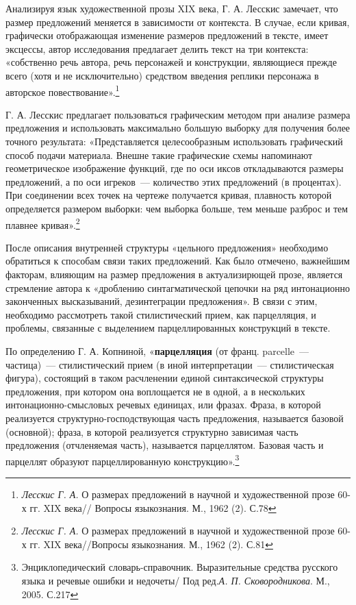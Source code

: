 \documentclass{kursa4}
\begin{document}
      Анализируя язык художественной прозы XIX века, Г. А. Лесскис замечает, что размер предложений меняется в зависимости от контекста. В случае, если кривая, графически отображающая изменение размеров предложений в тексте, имеет эксцессы, автор исследования предлагает делить текст на три контекста: «собственно речь автора, речь персонажей и конструкции, являющиеся прежде всего (хотя и не исключительно) средством введения реплики персонажа в авторское повествование».\footnote{\textit{{ Лесскис Г. А. }}{О размерах предложений в научной и художественной прозе 60-х гг. XIX века// Вопросы языкознания. М., 1962 (2). С.78}}

      Г. А. Лесскис предлагает пользоваться графическим методом при анализе размера предложения и использовать максимально большую выборку для получения более точного результата: «Представляется целесообразным использовать графический способ подачи материала. Внешне такие графические схемы напоминают геометрическое изображение функций, где по оси иксов откладываются размеры предложений, а по оси игреков~--- количество этих предложений (в процентах). При соединении всех точек на чертеже получается кривая, плавность которой определяется размером выборки: чем выборка больше, тем меньше разброс и тем плавнее кривая».\footnote{\textit{{ Лесскис Г. А. }}{О размерах предложений в научной и художественной прозе 60-х гг. XIX века//Вопросы языкознания. М., 1962 (2). С.81}}

      После описания внутренней структуры «цельного предложения» необходимо обратиться к способам связи таких предложений. Как было отмечено, важнейшим факторам, влияющим на размер предложения в актуализирющей прозе, является стремление автора к «дроблению синтагматической цепочки на ряд интонационно законченных высказываний, дезинтеграции предложения». В связи с этим, необходимо рассмотреть такой стилистический прием, как парцелляция, и проблемы, связанные с выделением парцеллированных конструкций в тексте. 

      По определению Г. А. Копниной, «\textbf{парцелляция} (от франц. parcelle~--- частица)~--- стилистический прием (в иной интерпретации~--- стилистическая фигура), состоящий в таком расчленении единой синтаксической структуры предложения, при котором она воплощается не в одной, а в нескольких интонационно-смысловых речевых единицах, или фразах. Фраза, в которой реализуется структурно-господствующая часть предложения, называется базовой (основной); фраза, в которой реализуется структурно зависимая часть предложения (отчленяемая часть), называется парцеллятом. Базовая часть и парцеллят образуют парцеллированную конструкцию».\footnote{Энциклопедический словарь-справочник. Выразительные средства русского языка и речевые ошибки и недочеты/ Под ред.\textit{А. П. Сковородникова}{. М., 2005. С.217}}
\end{document}
